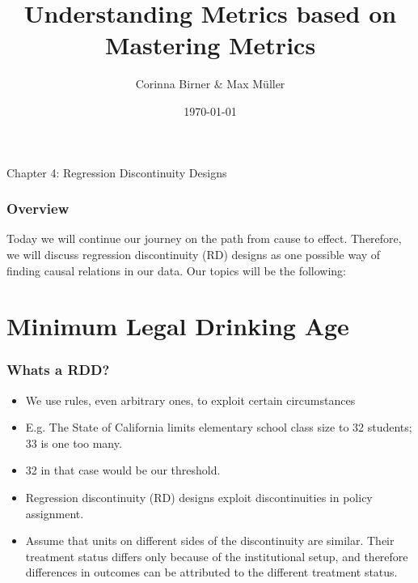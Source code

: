 \documentclass{beamer}
\title[Mastering Metrics]{Understanding Metrics based on Mastering Metrics } %
\author{Corinna Birner \& Max M{\"u}ller} %
\institute[JMU] %
{University of W{\"u}rzburg }\\ %
\date{\today} %
\begin{document}
\begin{frame}
\titlepage %
\end{frame}

\begin{frame}
\begin{center}
\textbf\Huge{Chapter 4: Regression Discontinuity Designs}
\end{center}
\end{frame}

\begin{frame}
\frametitle{Overview} %
Today we will continue our journey on the path from cause to effect. Therefore, we will discuss regression discontinuity (RD) designs as one possible way of finding causal relations in our data. Our topics will be the following:

\tableofcontents %
\end{frame}


\section{Minimum Legal Drinking Age}

\begin{frame}
\frametitle{Whats a RDD?}
\begin{itemize}
	\item We use rules, even arbitrary ones, to exploit certain circumstances
	\item E.g. The State of California limits elementary school class size to 32 students; 33 is one too many.
	\item	32 in that case would be our threshold.
	\item Regression discontinuity (RD) designs exploit discontinuities in policy assignment. 
	\item Assume that units on different sides of the discontinuity are similar. Their treatment status differs only because of the institutional setup, and therefore differences in outcomes can be attributed to the different treatment status.
\end{itemize}
\end{frame}
\end{document}
